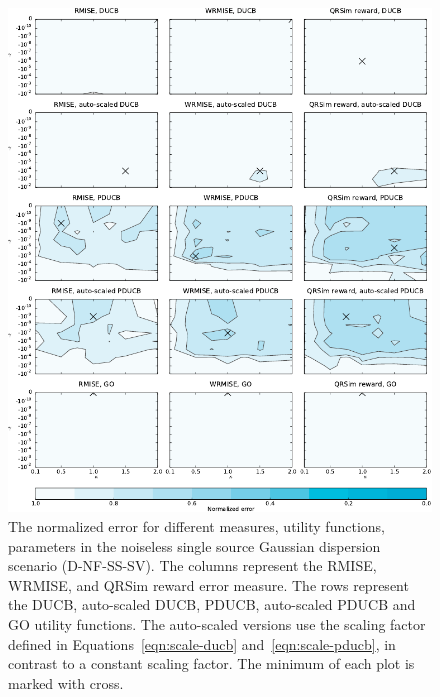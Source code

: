 \begin{figure}
    \centering
    \includegraphics{plots/psearch-D-NF-SS-SV}
    \caption[Normalized error (D-NF-SS-SV)]{The normalized error for different 
        measures, utility functions, parameters in the noiseless single source 
        Gaussian dispersion scenario (D-NF-SS-SV).  The columns represent the 
        RMISE, WRMISE, and QRSim reward error measure.  The rows represent the 
        DUCB, auto-scaled DUCB, PDUCB, auto-scaled PDUCB and GO utility 
        functions. The auto-scaled versions use the scaling factor defined in 
        Equations~\ref{eqn:scale-ducb} and~\ref{eqn:scale-pducb}, in contrast to 
        a constant scaling factor.  The minimum of each plot is marked with 
        cross.}\label{fig:psearch-D-NF-SS-SV}
\end{figure}

